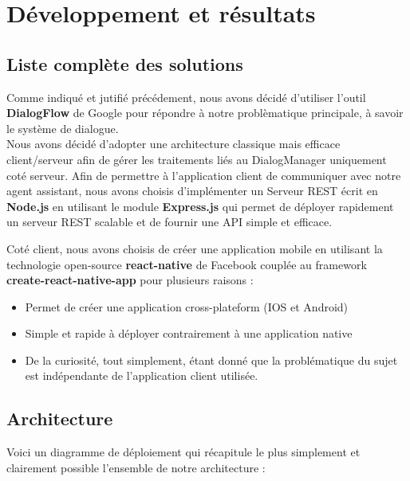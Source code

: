 \chapter{Développement et résultats}

\section{Liste complète des solutions}

Comme indiqué et jutifié précédement, nous avons décidé d'utiliser l'outil \textbf{DialogFlow} de Google\cite{dialogflow} pour répondre à notre problèmatique principale, à savoir 
le système de dialogue.\\

Nous avons décidé d'adopter une architecture classique mais efficace client/serveur afin de gérer les traitements liés au DialogManager uniquement coté serveur. Afin 
de permettre à l'application client de communiquer avec notre agent assistant, nous avons choisis d'implémenter un Serveur REST écrit en \textbf{Node.js}\cite{node} en
utilisant le module \textbf{Express.js}\cite{express} qui permet de déployer rapidement un serveur REST scalable et de fournir une API simple et efficace.

Coté client, nous avons choisis de créer une application mobile en utilisant la technologie open-source \textbf{react-native}\cite{reactnative} de Facebook couplée 
au framework \textbf{create-react-native-app}\cite{createnative} pour plusieurs raisons : 
\begin{itemize}
    \item Permet de créer une application cross-plateform (IOS et Android)
    \item Simple et rapide à déployer contrairement à une application native
    \item De la curiosité, tout simplement, étant donné que la problématique du sujet est indépendante de l'application client utilisée.
\end{itemize}

\section{Architecture}

Voici un diagramme de déploiement qui récapitule le plus simplement et clairement possible l'ensemble de notre architecture :



